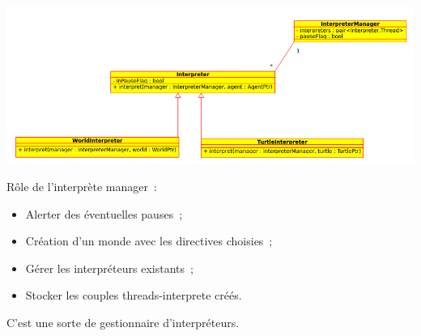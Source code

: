 
\begin{frame}
\includegraphics[scale=1]{doc/report/uml/interpreterUML.png}
\end{frame}

\begin{frame}
Rôle de l'interprète manager~:
\begin{itemize}
	\item Alerter des éventuelles pauses~;
	\item Création d'un monde avec les directives choisies~;
	\item Gérer les interpréteurs existants~;
	\item Stocker les couples threads-interprete créés.
\end{itemize}
C'est une sorte de gestionnaire d'interpréteurs.
\end{frame}

\begin{frame}
\end{frame}

